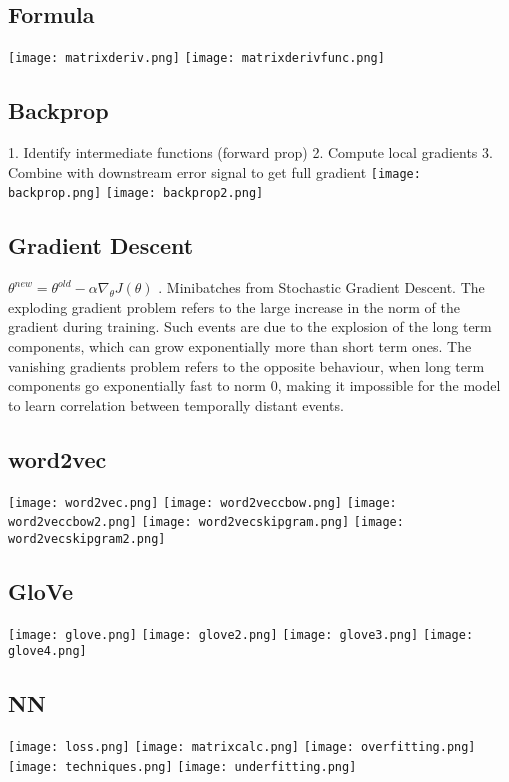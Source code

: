 \subsection*{Formula}
\texttt{[image: matrixderiv.png]}
\texttt{[image: matrixderivfunc.png]}

\subsection*{Backprop}
1. Identify intermediate functions (forward prop)
2. Compute local gradients
3. Combine with downstream error signal to get full gradient
\texttt{[image: backprop.png]}
\texttt{[image: backprop2.png]}

\subsection*{Gradient Descent}
$\theta^{new}=\theta^{old}-\alpha\nabla_\theta J(\theta)$
. Minibatches from Stochastic Gradient Descent.
The exploding gradient
problem refers to the large increase in the norm
of the gradient during training. Such events are due to
the explosion of the long term components, which can
grow exponentially more than short term ones. The
vanishing gradients problem refers to the opposite behaviour,
when long term components go exponentially
fast to norm 0, making it impossible for the model to
learn correlation between temporally distant events.

\subsection*{word2vec}
\texttt{[image: word2vec.png]}
\texttt{[image: word2veccbow.png]}
\texttt{[image: word2veccbow2.png]}
\texttt{[image: word2vecskipgram.png]}
\texttt{[image: word2vecskipgram2.png]}

\subsection*{GloVe}
\texttt{[image: glove.png]}
\texttt{[image: glove2.png]}
\texttt{[image: glove3.png]}
\texttt{[image: glove4.png]}

\subsection*{NN}
\texttt{[image: loss.png]}
\texttt{[image: matrixcalc.png]}
\texttt{[image: overfitting.png]}
\texttt{[image: techniques.png]}
\texttt{[image: underfitting.png]}


